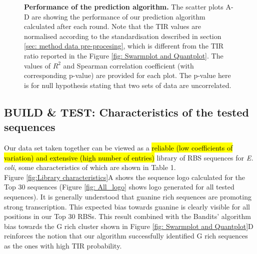 \documentclass{article}
\begin{document}
\begin{figure}[!ht]
\begin{subfigure}[b]{0.49\textwidth}
    \end{subfigure}
    \caption{\textbf{Performance of the prediction algorithm.} The scatter plots A-D are showing the performance of our prediction algorithm calculated after each round.
    Note that the TIR values are normalised according to the standardisation described in section \ref{sec: method data pre-procesing}, which is different from the TIR ratio reported in the Figure \ref{fig: Swarmplot and Quantplot}.
    The values of $R^2$ and Spearman correlation coefficient (with corresponding p-value) are provided for each plot.
    The p-value here is for null hypothesis stating that two sets of data are uncorrelated.
    }
    \label{fig: Scatterplot}
\end{figure}

\subsection{BUILD \& TEST: Characteristics of the tested sequences}
\label{sec:characteristics-of-library}

Our data set taken together can be viewed as a \hl{reliable (low coefficients of variation) and extensive (high number of entries)} library of RBS sequences for \emph{E. coli}, some characteristics of which are shown in Table 1.\\

Figure \ref{fig:Library characteristics}A shows the sequence logo calculated for the Top 30 sequences (Figure \ref{fig: All_logo} shows logo generated for all tested sequences).
It is generally understood that guanine rich sequences are promoting strong transcription.
This expected bias towards guanine is clearly visible for all positions in our Top 30 RBSs.
This result combined with the Bandits' algorithm bias towards the G rich cluster shown in Figure \ref{fig: Swarmplot and Quantplot}D reinforces the notion that our algorithm successfully identified G rich sequences as the ones with high TIR probability.\\
\end{document}

